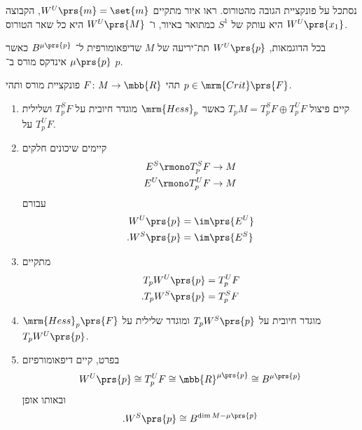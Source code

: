 \documentclass[a4paper,10pt,twoside,openany]{book}
\begin{document}
\begin{example}
נסתכל על פונקציית הגובה מהטורוס.
ראו איור
מתקיים
$W^U\prs{m} = \set{m}$,
הקבוצה
$W^U\prs{x_1}$
היא עותק של
$S^1$
כמתואר באיור, ו־%
$W^U\prs{M}$
היא כל שאר הטורוס.
\end{example}

\begin{remark}
בכל הדוגמאות,
$W^U\prs{p}$
תת־יריעה של
$M$
שדיפאומורפית ל־%
$B^{\mu\prs{p}}$
כאשר
$\mu\prs{p}$
אינדקס מורס ב־%
$p$.
\end{remark}

\begin{theorem}
תהי
$F \colon M \to \mbb{R}$
פונקציית מורס ותהי
$p \in \mrm{Crit}\prs{F}$.
\begin{enumerate}
\item קיים פיצול
$T_p M = T_p^SF \oplus T_p^UF$
כאשר
$\mrm{Hess}_p$
מוגדר חיובית על
$T_p^SF$
ושלילית על
$T_p^UF$.
\item קיימים שיכונים חלקים
\begin{align*}
E^S \rmono T_p^S F &\to M \\
E^U \rmono T_p^U F &\to M
\end{align*}
עבורם
\begin{align*}
W^U\prs{p} &= \im\prs{E^U} \\
\text{.} W^S\prs{p} &= \im \prs{E^S}
\end{align*}
\item מתקיים
\begin{align*}
T_p W^U\prs{p} &= T_p^U F \\
\text{.} T_pW^S\prs{p} &= T_p^S F
\end{align*}
\item $\mrm{Hess}_p\prs{F}$
מוגדר חיובית על
$T_p W^S\prs{p}$
ומוגדר שלילית על
$T_p W^U\prs{p}$.
\item בפרט,
קיים דיפאומורפיזם
\[W^U\prs{p} \cong T_p^U F \cong \mbb{R}^{\mu\prs{p}} \cong B^{\mu\prs{p}}\]
ובאותו אופן
\[\text{.} W^S\prs{p} \cong B^{\dim M - \mu\prs{p}}\]
\end{enumerate}
\end{theorem}




\backmatter
\end{document}
